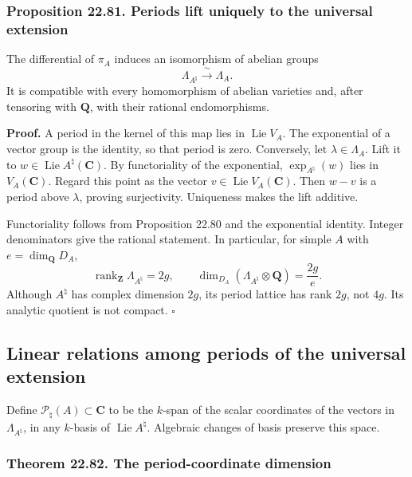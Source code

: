 \documentclass[
  11pt,
  a4paper,
]{article}
\begin{document}
\subsubsection{Proposition 22.81. Periods lift uniquely to the universal
extension}\label{proposition-22.81.-periods-lift-uniquely-to-the-universal-extension}

The differential of \(\pi_A\) induces an isomorphism of abelian groups
\[
 \Lambda_{A^\natural}\xrightarrow{\ \sim\ }\Lambda_A.
 \tag{22.197}
\] It is compatible with every homomorphism of abelian varieties and,
after tensoring with \(\mathbf Q\), with their rational endomorphisms.

\textbf{Proof.} A period in the kernel of this map lies in
\(\operatorname{Lie}V_A\). The exponential of a vector group is the
identity, so that period is zero. Conversely, let
\(\lambda\in\Lambda_A\). Lift it to
\(w\in\operatorname{Lie}A^\natural(\mathbf C)\). By functoriality of the
exponential, \(\exp_{A^\natural}(w)\) lies in \(V_A(\mathbf C)\). Regard
this point as the vector \(v\in\operatorname{Lie}V_A(\mathbf C)\). Then
\(w-v\) is a period above \(\lambda\), proving surjectivity. Uniqueness
makes the lift additive.

Functoriality follows from Proposition 22.80 and the exponential
identity. Integer denominators give the rational statement. In
particular, for simple \(A\) with \(e=\dim_{\mathbf Q}D_A\), \[
 \operatorname{rank}_{\mathbf Z}\Lambda_{A^\natural}=2g,\qquad
 \dim_{D_A}(\Lambda_{A^\natural}\otimes\mathbf Q)=\frac{2g}{e}.
 \tag{22.198}
\] Although \(A^\natural\) has complex dimension \(2g\), its period
lattice has rank \(2g\), not \(4g\). Its analytic quotient is not
compact. \(\square\)

\subsection{Linear relations among periods of the universal
extension}\label{linear-relations-among-periods-of-the-universal-extension}

Define \(\mathcal P_\natural(A)\subset\mathbf C\) to be the \(k\)-span
of the scalar coordinates of the vectors in \(\Lambda_{A^\natural}\), in
any \(k\)-basis of \(\operatorname{Lie}A^\natural\). Algebraic changes
of basis preserve this space.

\subsubsection{Theorem 22.82. The period-coordinate
dimension}\label{theorem-22.82.-the-period-coordinate-dimension}
\end{document}
